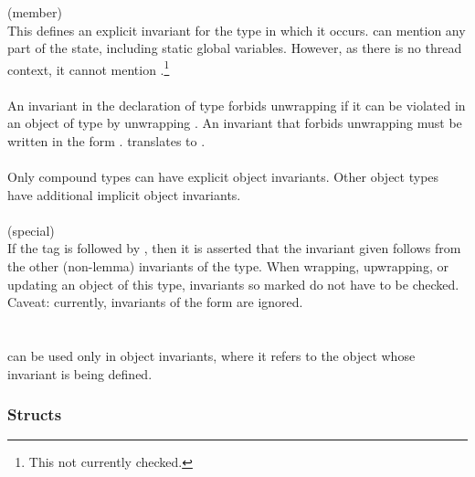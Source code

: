 \documentclass[preprint,nocopyrightspace]{sigplanconf}
\begin{document}
{{{\noindent{} (member)\\
This defines an explicit invariant for the type in which it occurs.
 can mention any part of the state, including
static global variables. However, as there is no thread context, it
cannot mention \vcc{\me}.\footnote{This not currently checked.}
\\\\
An invariant in the declaration of type  forbids unwrapping if
it can be violated in an object  of type  by
unwrapping . An invariant that forbids unwrapping must be
written in the form . 
 translates to 
.
\\\\
Only compound types can have explicit object invariants. Other object
types have additional implicit object invariants.
\\\\
 (special)\\
If the  tag is followed by , then it is
asserted that the invariant given follows from the other (non-lemma)
invariants of the type. When wrapping, upwrapping, or updating an
object of this type, invariants so marked do not have to be checked.
Caveat: currently,  invariants of the form
 are ignored.
\\\\
\\
\vcc{\this} can be used only in object invariants, where it refers to the
object whose invariant is being defined.

\subsubsection{Structs}

}}}
\end{document}
